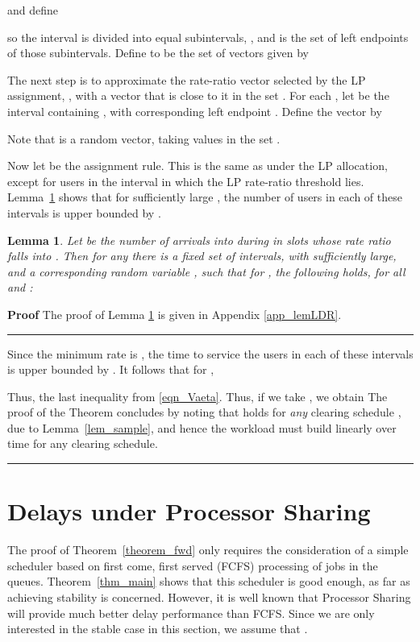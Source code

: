 \documentclass[12pt, draftcls, onecolumn]{IEEEtranTCOM}
\newtheorem{lemma}[theorem]{Lemma}
\newcommand\qed{\hfill \rule{1.2mm}{2.8mm}}
\begin{document}
{and define

so the interval  is divided into  equal subintervals, , and  is the set of left endpoints of those subintervals. Define  to be the set of  vectors given by


The next step is to approximate the rate-ratio vector selected by the LP assignment, , with a vector that is close to it in the set . For each , let  be the interval containing , with corresponding left endpoint . Define the vector  by

Note that  is a random vector, taking values in the set .


Now let  be the assignment rule. This is the same as under the LP allocation, except for users in the interval in which the LP rate-ratio threshold lies. Lemma~\ref{lem_LDR} shows that for sufficiently large , the number of users in each of these intervals is upper bounded by .

\begin{lemma}
\label{lem_LDR}
Let  be the number of arrivals into  during in slots 
whose rate ratio falls into . Then for any  there is a fixed set of intervals, with  sufficiently large, and a corresponding random variable , such that for , the following holds, for all  and :

\end{lemma}
{\bf Proof} The proof of Lemma \ref{lem_LDR} is given in Appendix \ref{app_lemLDR}. \qed

Since the minimum rate is , the time to service the users in each of these intervals is upper bounded by . It follows that for ,
{\small

}
Thus,
{\small
}
the last inequality from \eqref{eqn_Vaeta}. Thus, if we take , we obtain
{\small
}
The proof of the Theorem concludes by noting that
{\small
}
holds for {\it any} clearing schedule , due to Lemma~\ref{lem_sample}, and hence the workload must build linearly over time for any clearing schedule.
\qed


\section{Delays under Processor Sharing}
\label{sec-PS}
The proof of Theorem~\ref{theorem_fwd} only requires the consideration of a simple scheduler based on first come, first served (FCFS) processing of jobs in the queues. Theorem~\ref{thm_main} shows that this scheduler is good enough, as far as achieving stability is concerned. However, it is well known that Processor Sharing will provide much better delay performance than FCFS. Since we are only interested in the stable case in this section, we assume that .

}
\end{document}
